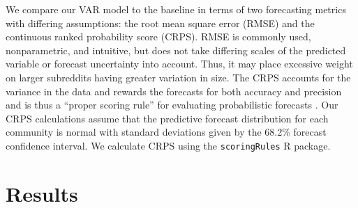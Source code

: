 \documentclass[letterpaper]{article}\usepackage[]{graphicx}\usepackage[]{color}
\begin{document}
We compare our VAR model to the baseline in terms of two forecasting metrics with differing assumptions: the root mean square error (RMSE) and the continuous ranked probability score (CRPS).  RMSE is commonly used, nonparametric, and intuitive, but does not take differing scales of the predicted variable or forecast uncertainty into account.  Thus,  it may place excessive weight on larger subreddits having greater variation in size. 
The CRPS accounts for the variance in the data and rewards the forecasts for both accuracy and precision and is thus a ``proper scoring rule'' for evaluating probabilistic forecasts \cite{gneiting_strictly_2007}. 
Our CRPS calculations assume that the predictive forecast distribution for each community is normal with standard deviations given by the 68.2\% forecast confidence interval. We calculate CRPS using the \texttt{scoringRules} R package.

\section{Results}
\label{sec:results}





\end{document}
